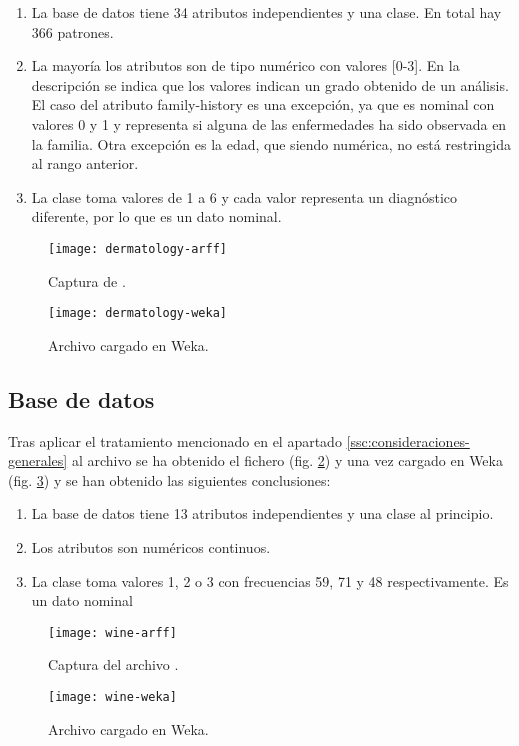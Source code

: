\begin{enumerate}
    \item La base de datos tiene 34 atributos independientes y una clase. En total hay 366 patrones.
    \item La mayoría los atributos son de tipo numérico con valores [0-3]. En la descripción se indica que los valores indican un grado obtenido de un análisis. El caso del atributo family-history es una excepción, ya que es nominal con valores 0 y 1 y representa si alguna de las enfermedades ha sido observada en la familia. Otra excepción es la edad, que siendo numérica, no está restringida al rango anterior.
    \item La clase toma valores de 1 a 6 y cada valor representa un diagnóstico diferente, por lo que es un dato nominal.
\end{enumerate}
\begin{figure}[ht]
    \centering
    \begin{minipage}{0.45\textwidth}
        \centering
        \texttt{[image: dermatology-arff]}
        \caption{Captura de .}
        \label{fig:dermatology-arff}
    \end{minipage}\hfill
    \begin{minipage}{0.55\textwidth}
        \centering
        \texttt{[image: dermatology-weka]}
        \caption{Archivo  cargado en Weka.}
        \label{fig:dermatology-weka}
    \end{minipage}
\end{figure}


\subsection{Base de datos }
Tras aplicar el tratamiento mencionado en el apartado \ref{ssc:consideraciones-generales} al archivo  se ha obtenido el fichero  (fig. \ref{fig:wine-arff}) y una vez cargado en Weka (fig. \ref{fig:wine-weka}) y se han obtenido las siguientes conclusiones:

\begin{enumerate}
\item La base de datos tiene 13 atributos independientes y una clase al principio.
\item Los atributos son numéricos continuos.
\item La clase toma valores 1, 2 o 3 con frecuencias 59, 71 y 48 respectivamente. Es un dato nominal
\end{enumerate}
\begin{figure}[ht]
    \centering
    \texttt{[image: wine-arff]}
    \caption{Captura del archivo .}
    \label{fig:wine-arff}
\end{figure}
\begin{figure}[ht]
    \centering
    \texttt{[image: wine-weka]}
    \caption{Archivo  cargado en Weka.}
    \label{fig:wine-weka}
\end{figure}


